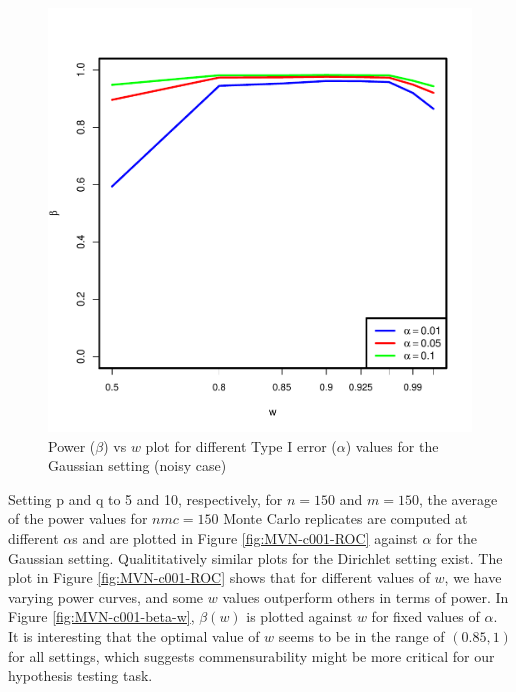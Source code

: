 \documentclass[11pt]{article} %
\begin{document}
\begin{figure}
\includegraphics[scale=0.95]{OOSDirichlet-power-w-c0-01.pdf}
\caption{Power ($\beta$) vs $w$ plot for different Type I error ($\alpha$) values for the Gaussian setting (noisy case)}
\label{fig:MVN-c001-power-w}
\end{figure}

Setting p and q to 5 and 10, respectively, for $n=150$ and $m=150$, the average of the power values for $nmc=150$ Monte Carlo replicates are computed at  different $\alpha$s and are plotted in Figure \ref{fig:MVN-c001-ROC} against $\alpha$ for the Gaussian setting.  Qualititatively similar plots for the Dirichlet setting  exist.  The plot in Figure \ref{fig:MVN-c001-ROC} shows that for different values of  $w$, we have varying power curves, and some $w$ values outperform others in terms of power. In Figure \ref{fig:MVN-c001-beta-w},  $\beta(w)$ is plotted against $w$ for fixed values of $\alpha$. It is  interesting that the optimal value of $w$ seems to be in the range of $(0.85,1)$ for all settings, which suggests commensurability might be more critical for our hypothesis testing task. 

\end{document}
